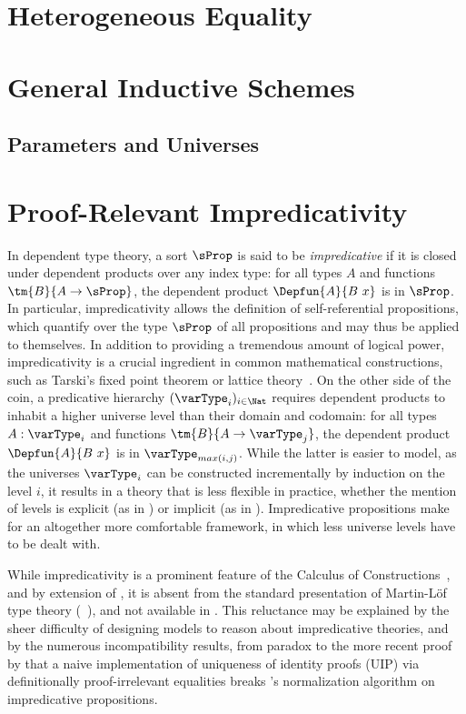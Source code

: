 \section{Heterogeneous Equality}

\section{General Inductive Schemes}

\subsection{Parameters and Universes}

\section{Proof-Relevant Impredicativity}
\label{sec:proof-rel-impred}

In dependent type theory, a sort \( \sProp \) is said to be
\emph{impredicative} if it is closed under dependent products over any index
type: for all types \( A \) and functions \( \tm{B}{A \to \sProp} \),
the dependent product \( \Depfun{A}{B\ x} \) is in \( \sProp \).
%
In particular, impredicativity allows the definition of self-referential propositions,
which quantify over the type \( \sProp \) of all propositions and may thus
be applied to themselves.
%
In addition to providing a tremendous amount of logical power, impredicativity is
a crucial ingredient in common mathematical constructions, such as
Tarski's fixed point theorem or lattice theory~.
%
On the other side of the coin, a predicative hierarchy $(\varType_i)_{i \in \Nat}$
requires dependent products to inhabit a higher universe level
than their domain and codomain: for all types \( A : \varType_i \) and functions
\( \tm{B}{A \to \varType_j} \), the dependent product
\( \Depfun{A}{B\ x} \) is in \( \varType_{max(i,j)} \).
%
While the latter is easier to model, as the universes $\varType_i$ can be
constructed incrementally by induction on the level $i$, it results
in a theory that is less flexible in practice, whether the mention of
levels is explicit (as in \Agda) or implicit (as in \Coq).
%
Impredicative propositions make for an altogether
more comfortable framework, in which less universe levels have to
be dealt with.

While impredicativity is a prominent feature of the Calculus of
Constructions~, and by extension of \Coq, it is
absent from the standard presentation of Martin-Löf type theory
(\MLTT~), and not available in \Agda.
%
This reluctance may be explained by the sheer difficulty of designing models
to reason about impredicative theories, and by the numerous incompatibility
results, from  paradox to the more recent proof by
 that a naive implementation of uniqueness of identity
proofs (UIP) via definitionally proof-irrelevant equalities breaks \Coq's
normalization algorithm on impredicative propositions.

